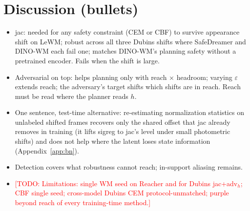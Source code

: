 \documentclass{article}
\newcommand{\todo}[1]{\textcolor{red}{[TODO: #1]}}
\begin{document}
\section{Discussion (bullets)}
\begin{itemize}
  \item jac: needed for any safety constraint (CEM or CBF) to survive appearance shift on LeWM; robust across all three Dubins shifts where SafeDreamer and DINO-WM each fail one; matches DINO-WM's planning safety without a pretrained encoder. Fails when the shift is large.
  \item Adversarial on top: helps planning only with reach $\times$ headroom; varying $\varepsilon$ extends reach; the adversary's target shifts which shifts are in reach. Reach must be read where the planner reads $h$.
  \item One sentence, test-time alternative: re-estimating normalization statistics on unlabeled shifted frames recovers only the shared offset that jac already removes in training (it lifts sigreg to jac's level under small photometric shifts) and does not help where the latent loses state information (Appendix~\ref{app:bn}).
  \item Detection covers what robustness cannot reach; in-support aliasing remains.
  \item \todo{Limitations: single WM seed on Reacher and for Dubins jac+adv$_h$; CBF single seed; cross-model Dubins CEM protocol-unmatched; purple beyond reach of every training-time method.}
\end{itemize}

\appendix
\end{document}

